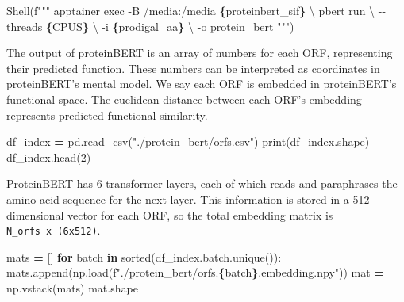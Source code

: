 \documentclass[
]{book}
\newenvironment{Shaded}{\begin{snugshade}}{\end{snugshade}}
\newcommand{\BuiltInTok}[1]{#1}
\newcommand{\CharTok}[1]{\textcolor[rgb]{0.31,0.60,0.02}{#1}}
\newcommand{\ControlFlowTok}[1]{\textcolor[rgb]{0.13,0.29,0.53}{\textbf{#1}}}
\newcommand{\DecValTok}[1]{\textcolor[rgb]{0.00,0.00,0.81}{#1}}
\newcommand{\KeywordTok}[1]{\textcolor[rgb]{0.13,0.29,0.53}{\textbf{#1}}}
\newcommand{\NormalTok}[1]{#1}
\newcommand{\OperatorTok}[1]{\textcolor[rgb]{0.81,0.36,0.00}{\textbf{#1}}}
\newcommand{\SpecialCharTok}[1]{\textcolor[rgb]{0.81,0.36,0.00}{\textbf{#1}}}
\newcommand{\SpecialStringTok}[1]{\textcolor[rgb]{0.31,0.60,0.02}{#1}}
\newcommand{\StringTok}[1]{\textcolor[rgb]{0.31,0.60,0.02}{#1}}
\begin{document}
\begin{Shaded}
\begin{Highlighting}[numbers=left,,]
\NormalTok{Shell(}\SpecialStringTok{f"""}
\SpecialStringTok{apptainer exec {-}B /media:/media }\SpecialCharTok{\{}\NormalTok{proteinbert\_sif}\SpecialCharTok{\}}\SpecialStringTok{ }\CharTok{\textbackslash{}}
\SpecialStringTok{    pbert run }\CharTok{\textbackslash{}}
\SpecialStringTok{        {-}{-}threads }\SpecialCharTok{\{}\NormalTok{CPUS}\SpecialCharTok{\}}\SpecialStringTok{ }\CharTok{\textbackslash{}}
\SpecialStringTok{        {-}i }\SpecialCharTok{\{}\NormalTok{prodigal\_aa}\SpecialCharTok{\}}\SpecialStringTok{ }\CharTok{\textbackslash{}}
\SpecialStringTok{        {-}o protein\_bert}
\SpecialStringTok{"""}\NormalTok{)}
\end{Highlighting}
\end{Shaded}

The output of proteinBERT is an array of numbers for each ORF, representing their predicted function.
These numbers can be interpreted as coordinates in proteinBERT's mental model.
We say each ORF is embedded in proteinBERT's functional space. The euclidean distance between each ORF's
embedding represents predicted functional similarity.

\begin{Shaded}
\begin{Highlighting}[numbers=left,,]
\NormalTok{df\_index }\OperatorTok{=}\NormalTok{ pd.read\_csv(}\StringTok{"./protein\_bert/orfs.csv"}\NormalTok{)}
\BuiltInTok{print}\NormalTok{(df\_index.shape)}
\NormalTok{df\_index.head(}\DecValTok{2}\NormalTok{)}
\end{Highlighting}
\end{Shaded}

ProteinBERT has 6 transformer layers, each of which reads and paraphrases the amino acid sequence for the next layer.
This information is stored in a 512-dimensional vector for each ORF, so the total embedding matrix is
\texttt{N\_orfs\ x\ (6x512)}.

\begin{Shaded}
\begin{Highlighting}[numbers=left,,]
\NormalTok{mats }\OperatorTok{=}\NormalTok{ []}
\ControlFlowTok{for}\NormalTok{ batch }\KeywordTok{in} \BuiltInTok{sorted}\NormalTok{(df\_index.batch.unique()):}
\NormalTok{    mats.append(np.load(}\SpecialStringTok{f"./protein\_bert/orfs.}\SpecialCharTok{\{}\NormalTok{batch}\SpecialCharTok{\}}\SpecialStringTok{.embedding.npy"}\NormalTok{))}
\NormalTok{mat }\OperatorTok{=}\NormalTok{ np.vstack(mats)}
\NormalTok{mat.shape}
\end{Highlighting}
\end{Shaded}
\end{document}
